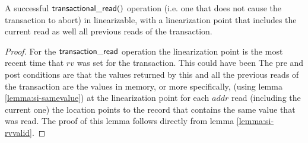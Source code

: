 \begin{lemma}
\label{lemma:si-tread}
A successful $\sf{transactional\_read}()$ operation (i.e. one that does not cause the transaction to abort) in linearizable,
with a linearization point that includes the current read as well all previous reads of the transaction.
\end{lemma}
\begin{proof}
For the $\sf{transaction\_read}$ operation the linearization point is the most recent time that $\mathit{rv}$ was set for the transaction.
This could have been 
The pre and post conditions are that the values returned by this and all the previous reads of the transaction are the values in memory, or more specifically, 
(using lemma \ref{lemma:si-samevalue}) at the linearization point for each $\mathit{addr}$ read (including the current one) the location points to the record
that contains the same value that was read.
The proof of this lemma follows directly from lemma \ref{lemma:si-rvvalid}.
\end{proof}




